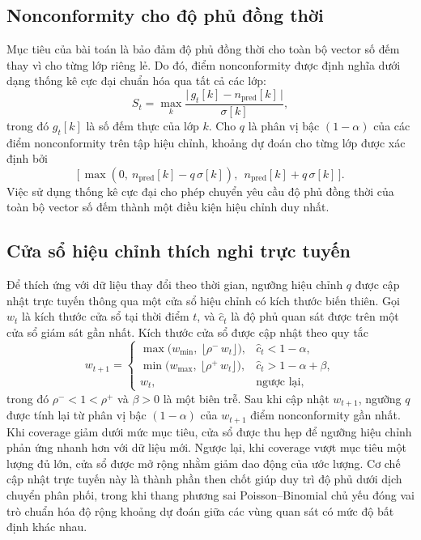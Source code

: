 \documentclass[pdflatex,sn-mathphys-num]{sn-jnl}
\begin{document}
\subsection{Nonconformity cho độ phủ đồng thời}
Mục tiêu của bài toán là bảo đảm độ phủ đồng thời cho toàn bộ vector số đếm thay vì cho từng lớp riêng lẻ. Do
đó, điểm nonconformity được định nghĩa dưới dạng thống kê cực đại chuẩn hóa qua tất cả các lớp:
\begin{equation}
S_t=\max_k \frac{\big|\,g_t[k]-n_{\mathrm{pred}}[k]\,\big|}{\sigma[k]}, \label{eq:maxstat}
\end{equation}
trong đó $g_t[k]$ là số đếm thực của lớp $k$. Cho $q$ là phân vị bậc $(1-\alpha)$ của các điểm nonconformity
trên tập hiệu chỉnh, khoảng dự đoán cho từng lớp được xác định bởi
\[
\big[\,\max(0,\ n_{\mathrm{pred}}[k]-q\,\sigma[k]),\ \ n_{\mathrm{pred}}[k]+q\,\sigma[k]\,\big].
\]
Việc sử dụng thống kê cực đại cho phép chuyển yêu cầu độ phủ đồng thời của toàn bộ vector số đếm thành một
điều kiện hiệu chỉnh duy nhất.

\subsection{Cửa sổ hiệu chỉnh thích nghi trực tuyến}
Để thích ứng với dữ liệu thay đổi theo thời gian, ngưỡng hiệu chỉnh $q$ được cập nhật trực tuyến thông qua
một cửa sổ hiệu chỉnh có kích thước biến thiên. Gọi $w_t$ là kích thước cửa sổ tại thời điểm $t$, và
$\hat c_t$ là độ phủ quan sát được trên một cửa sổ giám sát gần nhất. Kích thước cửa sổ được cập nhật theo
quy tắc
\begin{equation}
w_{t+1}=
\begin{cases}
\max\!\big(w_{\min},\ \lfloor \rho^{-}\,w_t \rfloor\big), & \hat c_t < 1-\alpha,\\[4pt]
\min\!\big(w_{\max},\ \lfloor \rho^{+}\,w_t \rfloor\big), & \hat c_t > 1-\alpha+\beta,\\[4pt]
w_t, & \text{ngược lại},
\end{cases}
\label{eq:window}
\end{equation}
trong đó $\rho^{-}<1<\rho^{+}$ và $\beta>0$ là một biên trễ. Sau khi cập nhật $w_{t+1}$, ngưỡng $q$ được tính
lại từ phân vị bậc $(1-\alpha)$ của $w_{t+1}$ điểm nonconformity gần nhất. Khi coverage giảm dưới mức mục
tiêu, cửa sổ được thu hẹp để ngưỡng hiệu chỉnh phản ứng nhanh hơn với dữ liệu mới. Ngược lại, khi coverage
vượt mục tiêu một lượng đủ lớn, cửa sổ được mở rộng nhằm giảm dao động của ước lượng. Cơ chế cập nhật trực
tuyến này là thành phần then chốt giúp duy trì độ phủ dưới dịch chuyển phân phối, trong khi thang phương sai
Poisson--Binomial chủ yếu đóng vai trò chuẩn hóa độ rộng khoảng dự đoán giữa các vùng quan sát có mức độ bất
định khác nhau.
\end{document}
